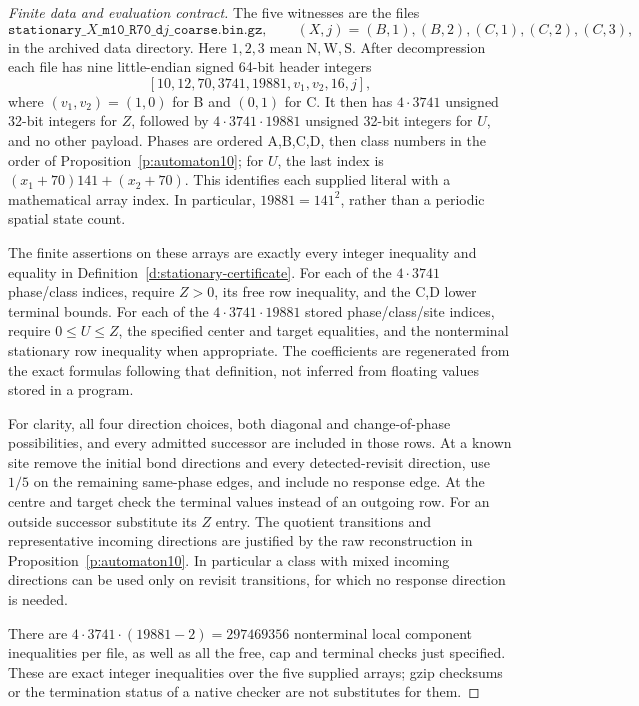 \begin{proof}[Finite data and evaluation contract]
The five witnesses are the files
\[
 \texttt{stationary\_}\!X\texttt{\_m10\_R70\_d}j
                  \texttt{\_coarse.bin.gz},
 \qquad (X,j)=(B,1),(B,2),(C,1),(C,2),(C,3),
\]
in the archived data directory. Here \(1,2,3\) mean
\(\mathrm N,\mathrm W,\mathrm S\). After decompression each file
has nine little-endian signed 64-bit header integers
\[
 [10,12,70,3741,19881,v_1,v_2,16,j],
\]
where \((v_1,v_2)=(1,0)\) for B and \((0,1)\) for C.
It then has \(4\cdot3741\) unsigned 32-bit integers for \(Z\),
followed by \(4\cdot3741\cdot19881\) unsigned 32-bit integers
for \(U\), and no other payload. Phases are ordered A,B,C,D,
then class numbers in the order of
Proposition~\ref{p:automaton10}; for \(U\), the last index is
\((x_1+70)141+(x_2+70)\). This identifies each supplied literal
with a mathematical array index. In particular,
\(19881=141^2\), rather than a periodic spatial state count.

The finite assertions on these arrays are exactly every integer
inequality and equality in Definition~\ref{d:stationary-certificate}.
For each of the \(4\cdot3741\) phase/class indices, require
\(Z>0\), its free row inequality, and the C,D lower terminal
bounds. For each of the \(4\cdot3741\cdot19881\) stored
phase/class/site indices, require \(0\le U\le Z\), the specified
center and target equalities, and the nonterminal stationary row
inequality when appropriate. The coefficients are regenerated
from the exact formulas following that definition, not inferred
from floating values stored in a program.

For clarity, all four direction choices, both diagonal and
change-of-phase possibilities, and every admitted successor are
included in those rows. At a known site remove the initial bond
directions and every detected-revisit direction, use \(1/5\) on
the remaining same-phase edges, and include no response edge.
At the centre and target check the terminal values instead of an
outgoing row. For an outside successor substitute its \(Z\) entry.
The quotient transitions and representative incoming directions
are justified by the raw reconstruction in
Proposition~\ref{p:automaton10}. In particular a class with mixed
incoming directions can be used only on revisit transitions, for
which no response direction is needed.

There are \(4\cdot3741\cdot(19881-2)=297469356\) nonterminal
local component inequalities per file, as well as all the free,
cap and terminal checks just specified. These are exact integer
inequalities over the five supplied arrays; gzip checksums or the
termination status of a native checker are not substitutes for them.


\end{proof}

